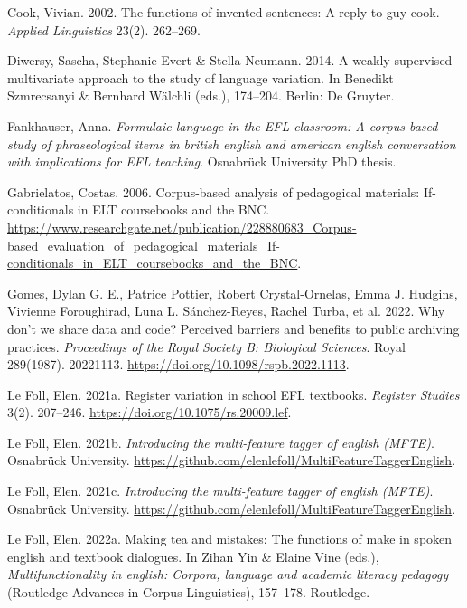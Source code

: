 \documentclass[
  letterpaper,
  DIV=11,
  numbers=noendperiod]{scrreprt}
\newlength{\cslhangindent}
\newenvironment{CSLReferences}[2] %
 {\begin{list}{}{%
  \setlength{\itemindent}{0pt}
  \setlength{\leftmargin}{0pt}
  \setlength{\parsep}{0pt}
  \ifodd #1
   \setlength{\leftmargin}{\cslhangindent}
   \setlength{\itemindent}{-1\cslhangindent}
  \fi
  \setlength{\itemsep}{#2\baselineskip}}}
 {\end{list}}
\begin{document}
\begin{CSLReferences}{1}{0}
Cook, Vivian. 2002. The functions of invented sentences: A reply to guy
cook. \emph{Applied Linguistics} 23(2). 262--269.

Diwersy, Sascha, Stephanie Evert \& Stella Neumann. 2014. A weakly
supervised multivariate approach to the study of language variation. In
Benedikt Szmrecsanyi \& Bernhard Wälchli (eds.), 174--204. Berlin: De
Gruyter.

Fankhauser, Anna. \emph{Formulaic language in the EFL classroom: A
corpus-based study of phraseological items in british english and
american english conversation with implications for EFL teaching}.
Osnabrück University PhD thesis.

Gabrielatos, Costas. 2006. Corpus-based analysis of pedagogical
materials: If-conditionals in ELT coursebooks and the BNC.
\url{https://www.researchgate.net/publication/228880683_Corpus-based_evaluation_of_pedagogical_materials_If-conditionals_in_ELT_coursebooks_and_the_BNC}.

Gomes, Dylan G. E., Patrice Pottier, Robert Crystal-Ornelas, Emma J.
Hudgins, Vivienne Foroughirad, Luna L. Sánchez-Reyes, Rachel Turba, et
al. 2022. Why don't we share data and code? Perceived barriers and
benefits to public archiving practices. \emph{Proceedings of the Royal
Society B: Biological Sciences}. Royal 289(1987). 20221113.
\url{https://doi.org/10.1098/rspb.2022.1113}.

Le Foll, Elen. 2021a. Register variation in school EFL textbooks.
\emph{Register Studies} 3(2). 207--246.
\url{https://doi.org/10.1075/rs.20009.lef}.

Le Foll, Elen. 2021b. \emph{Introducing the multi-feature tagger of
english (MFTE)}. Osnabrück University.
\url{https://github.com/elenlefoll/MultiFeatureTaggerEnglish}.

Le Foll, Elen. 2021c. \emph{Introducing the multi-feature tagger of
english (MFTE)}. Osnabrück University.
\url{https://github.com/elenlefoll/MultiFeatureTaggerEnglish}.

Le Foll, Elen. 2022a. Making tea and mistakes: The functions of make in
spoken english and textbook dialogues. In Zihan Yin \& Elaine Vine
(eds.), \emph{Multifunctionality in english: Corpora, language and
academic literacy pedagogy} (Routledge Advances in Corpus Linguistics),
157--178. Routledge.


\end{CSLReferences}
\end{document}
